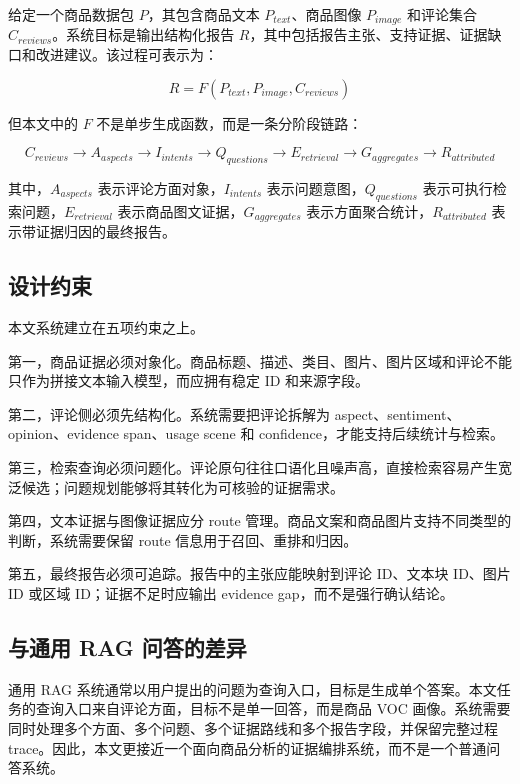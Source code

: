 \documentclass[11pt]{article}
\begin{document}
给定一个商品数据包 \(P\)，其包含商品文本 \(P_{text}\)、商品图像 \(P_{image}\) 和评论集合 \(C_{reviews}\)。系统目标是输出结构化报告 \(R\)，其中包括报告主张、支持证据、证据缺口和改进建议。该过程可表示为：

\[
R = F(P_{text}, P_{image}, C_{reviews})
\]

但本文中的 \(F\) 不是单步生成函数，而是一条分阶段链路：

\[
C_{reviews} \rightarrow A_{aspects} \rightarrow I_{intents} \rightarrow Q_{questions} \rightarrow E_{retrieval} \rightarrow G_{aggregates} \rightarrow R_{attributed}
\]

其中，\(A_{aspects}\) 表示评论方面对象，\(I_{intents}\) 表示问题意图，\(Q_{questions}\) 表示可执行检索问题，\(E_{retrieval}\) 表示商品图文证据，\(G_{aggregates}\) 表示方面聚合统计，\(R_{attributed}\) 表示带证据归因的最终报告。

\subsection{设计约束}

本文系统建立在五项约束之上。

第一，商品证据必须对象化。商品标题、描述、类目、图片、图片区域和评论不能只作为拼接文本输入模型，而应拥有稳定 ID 和来源字段。

第二，评论侧必须先结构化。系统需要把评论拆解为 aspect、sentiment、opinion、evidence span、usage scene 和 confidence，才能支持后续统计与检索。

第三，检索查询必须问题化。评论原句往往口语化且噪声高，直接检索容易产生宽泛候选；问题规划能够将其转化为可核验的证据需求。

第四，文本证据与图像证据应分 route 管理。商品文案和商品图片支持不同类型的判断，系统需要保留 route 信息用于召回、重排和归因。

第五，最终报告必须可追踪。报告中的主张应能映射到评论 ID、文本块 ID、图片 ID 或区域 ID；证据不足时应输出 evidence gap，而不是强行确认结论。

\subsection{与通用 RAG 问答的差异}

通用 RAG 系统通常以用户提出的问题为查询入口，目标是生成单个答案。本文任务的查询入口来自评论方面，目标不是单一回答，而是商品 VOC 画像。系统需要同时处理多个方面、多个问题、多个证据路线和多个报告字段，并保留完整过程 trace。因此，本文更接近一个面向商品分析的证据编排系统，而不是一个普通问答系统。
\end{document}
